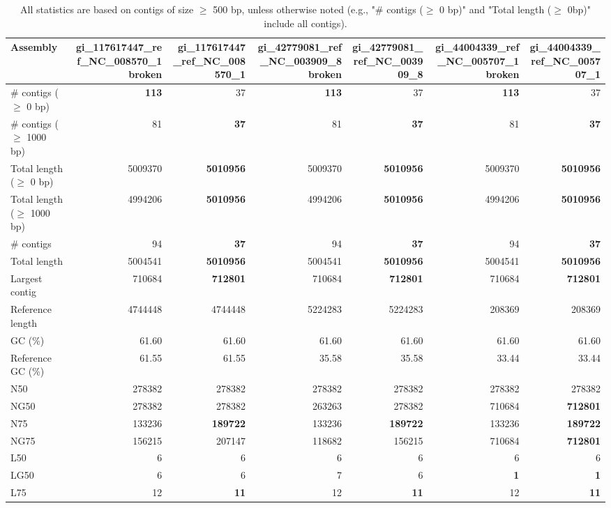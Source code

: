 \documentclass[12pt,a4paper]{article}
\begin{document}
\begin{table}[ht]
\begin{center}
\caption{All statistics are based on contigs of size $\geq$ 500 bp, unless otherwise noted (e.g., "\# contigs ($\geq$ 0 bp)" and "Total length ($\geq$ 0bp)" include all contigs).}
\begin{tabular}{|l*{6}{|r}|}
\hline
Assembly & gi\_117617447\_ref\_NC\_008570\_1 broken & gi\_117617447\_ref\_NC\_008570\_1 & gi\_42779081\_ref\_NC\_003909\_8 broken & gi\_42779081\_ref\_NC\_003909\_8 & gi\_44004339\_ref\_NC\_005707\_1 broken & gi\_44004339\_ref\_NC\_005707\_1 \\ \hline
\# contigs ($\geq$ 0 bp) & {\bf 113} & 37 & {\bf 113} & 37 & {\bf 113} & 37 \\ \hline
\# contigs ($\geq$ 1000 bp) & 81 & {\bf 37} & 81 & {\bf 37} & 81 & {\bf 37} \\ \hline
Total length ($\geq$ 0 bp) & 5009370 & {\bf 5010956} & 5009370 & {\bf 5010956} & 5009370 & {\bf 5010956} \\ \hline
Total length ($\geq$ 1000 bp) & 4994206 & {\bf 5010956} & 4994206 & {\bf 5010956} & 4994206 & {\bf 5010956} \\ \hline
\# contigs & 94 & {\bf 37} & 94 & {\bf 37} & 94 & {\bf 37} \\ \hline
Total length & 5004541 & {\bf 5010956} & 5004541 & {\bf 5010956} & 5004541 & {\bf 5010956} \\ \hline
Largest contig & 710684 & {\bf 712801} & 710684 & {\bf 712801} & 710684 & {\bf 712801} \\ \hline
Reference length & 4744448 & 4744448 & 5224283 & 5224283 & 208369 & 208369 \\ \hline
GC (\%) & 61.60 & 61.60 & 61.60 & 61.60 & 61.60 & 61.60 \\ \hline
Reference GC (\%) & 61.55 & 61.55 & 35.58 & 35.58 & 33.44 & 33.44 \\ \hline
N50 & 278382 & 278382 & 278382 & 278382 & 278382 & 278382 \\ \hline
NG50 & 278382 & 278382 & 263263 & 278382 & 710684 & {\bf 712801} \\ \hline
N75 & 133236 & {\bf 189722} & 133236 & {\bf 189722} & 133236 & {\bf 189722} \\ \hline
NG75 & 156215 & 207147 & 118682 & 156215 & 710684 & {\bf 712801} \\ \hline
L50 & 6 & 6 & 6 & 6 & 6 & 6 \\ \hline
LG50 & 6 & 6 & 7 & 6 & {\bf 1} & {\bf 1} \\ \hline
L75 & 12 & {\bf 11} & 12 & {\bf 11} & 12 & {\bf 11} \\ \hline

\end{tabular}
\end{center}
\end{table}
\end{document}
